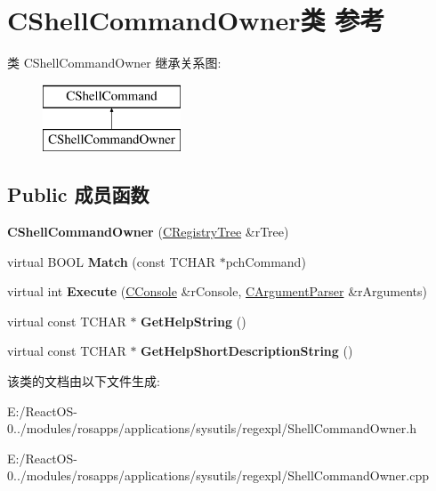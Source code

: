 \hypertarget{class_c_shell_command_owner}{}\section{C\+Shell\+Command\+Owner类 参考}
\label{class_c_shell_command_owner}
类 C\+Shell\+Command\+Owner 继承关系图\+:\begin{figure}[H]
\begin{center}
\leavevmode
\includegraphics[height=2.000000cm]{class_c_shell_command_owner}
\end{center}
\end{figure}
\subsection*{Public 成员函数}
\begin{DoxyCompactItemize}
\item 
\mbox{\label{class_c_shell_command_owner_a5bf7cea74e354ee35010cb85a4aec4a3}} 
{\bfseries C\+Shell\+Command\+Owner} (\hyperlink{class_c_registry_tree}{C\+Registry\+Tree} \&r\+Tree)
\item 
\mbox{\label{class_c_shell_command_owner_a7d34428bc42bc08b51a2111208647161}} 
virtual B\+O\+OL {\bfseries Match} (const T\+C\+H\+AR $\ast$pch\+Command)
\item 
\mbox{\label{class_c_shell_command_owner_a849c1299b37a2359e268c20e0e40073d}} 
virtual int {\bfseries Execute} (\hyperlink{class_c_console}{C\+Console} \&r\+Console, \hyperlink{class_c_argument_parser}{C\+Argument\+Parser} \&r\+Arguments)
\item 
\mbox{\label{class_c_shell_command_owner_a91e6f7dc9d48fe55194cca42acd44c46}} 
virtual const T\+C\+H\+AR $\ast$ {\bfseries Get\+Help\+String} ()
\item 
\mbox{\label{class_c_shell_command_owner_a834173dd1ba0c88472b6abc6c6028508}} 
virtual const T\+C\+H\+AR $\ast$ {\bfseries Get\+Help\+Short\+Description\+String} ()
\end{DoxyCompactItemize}


该类的文档由以下文件生成\+:\begin{DoxyCompactItemize}
\item 
E\+:/\+React\+O\+S-\/0../modules/rosapps/applications/sysutils/regexpl/Shell\+Command\+Owner.\+h\item 
E\+:/\+React\+O\+S-\/0../modules/rosapps/applications/sysutils/regexpl/Shell\+Command\+Owner.\+cpp\end{DoxyCompactItemize}
